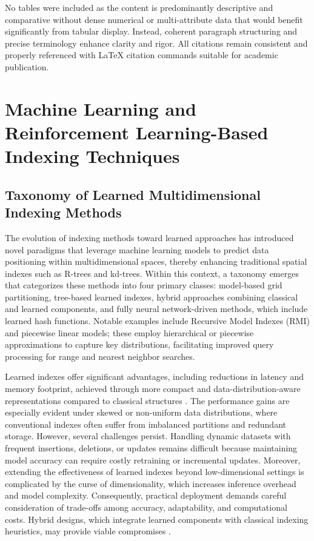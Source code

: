 \documentclass[11pt]{article}
\begin{document}
No tables were included as the content is predominantly descriptive and comparative without dense numerical or multi-attribute data that would benefit significantly from tabular display. Instead, coherent paragraph structuring and precise terminology enhance clarity and rigor. All citations remain consistent and properly referenced with LaTeX citation commands suitable for academic publication.

\section{Machine Learning and Reinforcement Learning-Based Indexing Techniques}

\subsection{Taxonomy of Learned Multidimensional Indexing Methods}

The evolution of indexing methods toward learned approaches has introduced novel paradigms that leverage machine learning models to predict data positioning within multidimensional spaces, thereby enhancing traditional spatial indexes such as R-trees and kd-trees. Within this context, a taxonomy emerges that categorizes these methods into four primary classes: model-based grid partitioning, tree-based learned indexes, hybrid approaches combining classical and learned components, and fully neural network-driven methods, which include learned hash functions. Notable examples include Recursive Model Indexes (RMI) and piecewise linear models; these employ hierarchical or piecewise approximations to capture key distributions, facilitating improved query processing for range and nearest neighbor searches.

Learned indexes offer significant advantages, including reductions in latency and memory footprint, achieved through more compact and data-distribution-aware representations compared to classical structures \cite{ref34}. The performance gains are especially evident under skewed or non-uniform data distributions, where conventional indexes often suffer from imbalanced partitions and redundant storage. However, several challenges persist. Handling dynamic datasets with frequent insertions, deletions, or updates remains difficult because maintaining model accuracy can require costly retraining or incremental updates. Moreover, extending the effectiveness of learned indexes beyond low-dimensional settings is complicated by the curse of dimensionality, which increases inference overhead and model complexity. Consequently, practical deployment demands careful consideration of trade-offs among accuracy, adaptability, and computational costs. Hybrid designs, which integrate learned components with classical indexing heuristics, may provide viable compromises \cite{ref34}.
\end{document}
